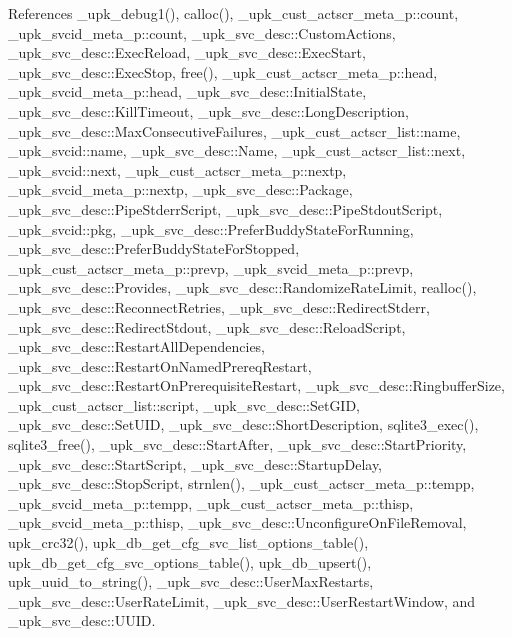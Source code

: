 References \_\-upk\_\-debug1(), calloc(), \_\-upk\_\-cust\_\-actscr\_\-meta\_\-p::count, \_\-upk\_\-svcid\_\-meta\_\-p::count, \_\-upk\_\-svc\_\-desc::CustomActions, \_\-upk\_\-svc\_\-desc::ExecReload, \_\-upk\_\-svc\_\-desc::ExecStart, \_\-upk\_\-svc\_\-desc::ExecStop, free(), \_\-upk\_\-cust\_\-actscr\_\-meta\_\-p::head, \_\-upk\_\-svcid\_\-meta\_\-p::head, \_\-upk\_\-svc\_\-desc::InitialState, \_\-upk\_\-svc\_\-desc::KillTimeout, \_\-upk\_\-svc\_\-desc::LongDescription, \_\-upk\_\-svc\_\-desc::MaxConsecutiveFailures, \_\-upk\_\-cust\_\-actscr\_\-list::name, \_\-upk\_\-svcid::name, \_\-upk\_\-svc\_\-desc::Name, \_\-upk\_\-cust\_\-actscr\_\-list::next, \_\-upk\_\-svcid::next, \_\-upk\_\-cust\_\-actscr\_\-meta\_\-p::nextp, \_\-upk\_\-svcid\_\-meta\_\-p::nextp, \_\-upk\_\-svc\_\-desc::Package, \_\-upk\_\-svc\_\-desc::PipeStderrScript, \_\-upk\_\-svc\_\-desc::PipeStdoutScript, \_\-upk\_\-svcid::pkg, \_\-upk\_\-svc\_\-desc::PreferBuddyStateForRunning, \_\-upk\_\-svc\_\-desc::PreferBuddyStateForStopped, \_\-upk\_\-cust\_\-actscr\_\-meta\_\-p::prevp, \_\-upk\_\-svcid\_\-meta\_\-p::prevp, \_\-upk\_\-svc\_\-desc::Provides, \_\-upk\_\-svc\_\-desc::RandomizeRateLimit, realloc(), \_\-upk\_\-svc\_\-desc::ReconnectRetries, \_\-upk\_\-svc\_\-desc::RedirectStderr, \_\-upk\_\-svc\_\-desc::RedirectStdout, \_\-upk\_\-svc\_\-desc::ReloadScript, \_\-upk\_\-svc\_\-desc::RestartAllDependencies, \_\-upk\_\-svc\_\-desc::RestartOnNamedPrereqRestart, \_\-upk\_\-svc\_\-desc::RestartOnPrerequisiteRestart, \_\-upk\_\-svc\_\-desc::RingbufferSize, \_\-upk\_\-cust\_\-actscr\_\-list::script, \_\-upk\_\-svc\_\-desc::SetGID, \_\-upk\_\-svc\_\-desc::SetUID, \_\-upk\_\-svc\_\-desc::ShortDescription, sqlite3\_\-exec(), sqlite3\_\-free(), \_\-upk\_\-svc\_\-desc::StartAfter, \_\-upk\_\-svc\_\-desc::StartPriority, \_\-upk\_\-svc\_\-desc::StartScript, \_\-upk\_\-svc\_\-desc::StartupDelay, \_\-upk\_\-svc\_\-desc::StopScript, strnlen(), \_\-upk\_\-cust\_\-actscr\_\-meta\_\-p::tempp, \_\-upk\_\-svcid\_\-meta\_\-p::tempp, \_\-upk\_\-cust\_\-actscr\_\-meta\_\-p::thisp, \_\-upk\_\-svcid\_\-meta\_\-p::thisp, \_\-upk\_\-svc\_\-desc::UnconfigureOnFileRemoval, upk\_\-crc32(), upk\_\-db\_\-get\_\-cfg\_\-svc\_\-list\_\-options\_\-table(), upk\_\-db\_\-get\_\-cfg\_\-svc\_\-options\_\-table(), upk\_\-db\_\-upsert(), upk\_\-uuid\_\-to\_\-string(), \_\-upk\_\-svc\_\-desc::UserMaxRestarts, \_\-upk\_\-svc\_\-desc::UserRateLimit, \_\-upk\_\-svc\_\-desc::UserRestartWindow, and \_\-upk\_\-svc\_\-desc::UUID.



